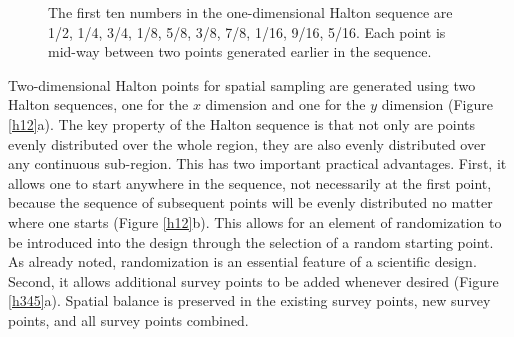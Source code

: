 \documentclass[a4paper,11pt, draft]{article} %
\begin{document}
\begin{figure}[htbp]
\centering
{}
\caption{The first ten numbers in the one-dimensional Halton sequence are 1/2, 1/4, 3/4, 1/8, 5/8, 3/8, 7/8, 1/16, 9/16, 5/16. Each point is mid-way between two points generated earlier in the sequence.}
\label{halton}
\end{figure}

Two-dimensional Halton points for spatial sampling are generated using two Halton sequences, one for the $x$ dimension and one for the $y$ dimension (Figure \ref{h12}a). The key property of the Halton sequence is that not only are points evenly distributed over the whole region, they are also evenly distributed over any continuous sub-region. This has two important practical advantages. First, it allows one to start anywhere in the sequence, not necessarily at the first point, because the sequence of subsequent points will be evenly distributed no matter where one starts (Figure \ref{h12}b). This allows for an element of randomization to be introduced into the design through the selection of a random starting point. As already noted, randomization is an essential feature of a scientific design. Second, it allows additional survey points to be added whenever desired (Figure \ref{h345}a). Spatial balance is preserved in the existing survey points, new survey points, and all survey points combined. 
\end{document}
